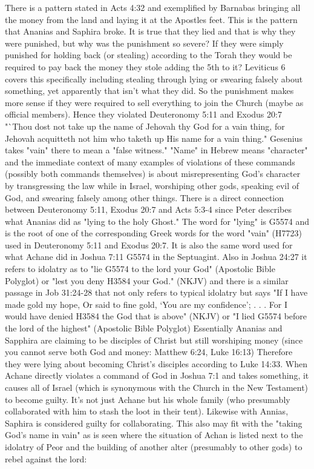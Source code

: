 \documentclass[11pt]{article}
\begin{document}
There is a pattern stated in Acts 4:32 and exemplified by Barnabas bringing all the money from the land and laying it at the Apostles feet. This is the pattern that Ananias and Saphira broke. It is true that they lied and that is why they were punished, but why was the punishment so severe? If they were simply punished for holding back (or stealing) according to the Torah they would be required to pay back the money they stole adding the 5th to it? Leviticus 6 covers this specifically including stealing through lying or swearing falsely about something, yet apparently that isn't what they did. So the punishment makes more sense if they were required to sell everything to join the Church (maybe as official members). Hence they violated Deuteronomy 5:11 and Exodus 20:7 "`Thou dost not take up the name of Jehovah thy God for a vain thing, for Jehovah acquitteth not him who taketh up His name for a vain thing."
Gesenius takes "vain" there to mean a "false witness." "Name" in Hebrew means "character" \cite{name means character} and the immediate context of many examples of violations of these commands (possibly both commands themselves) is about misrepresenting God's character by transgressing the law while in Israel, worshiping other gods, speaking evil of God, and swearing falsely among other things. There is a direct connection between Deuteronomy 5:11, Exodus 20:7 and Acts 5:3-4 since Peter describes what Ananias did as "lying to the holy Ghost." The word for "lying" is G5574 and is the root of one of the corresponding Greek words for the word "vain" (H7723) used in Deuteronomy 5:11 and Exodus 20:7. It is also the same word used for what Achane did in Joshua 7:11 G5574 in the Septuagint. Also in Joshua 24:27 it refers to idolatry as to "lie G5574 to the lord your God" (Apostolic Bible Polyglot) or "lest you deny H3584 your God." (NKJV) and there is a similar passage in Job 31:24-28 that not only refers to typical idolatry but says "If I have made gold my hope, Or said to fine gold, ‘You are my confidence’;  . . . For I would have denied H3584 the God that is above" (NKJV) or "I lied G5574 before the lord of the highest" (Apostolic Bible Polyglot) \cite{in vain} Essentially Ananias and Sapphira are claiming to be disciples of Christ but still worshiping money (since you cannot serve both God and money: Matthew 6:24, Luke 16:13) Therefore they were lying about becoming Christ's disciples according to Luke 14:33. When Achane directly violates a command of God in Joshua 7:1 and takes something, it causes all of Israel (which is synonymous with the Church in the New Testament) to become guilty. It's not just Achane but his whole family (who presumably collaborated with him to stash the loot in their tent). Likewise with Annias, Saphira is considered guilty for collaborating. This also may fit with the "taking God's name in vain" as is seen where the situation of Achan is listed next to the idolatry of Peor and the building of another alter (presumably to other gods) to rebel  against the lord:
\end{document}

